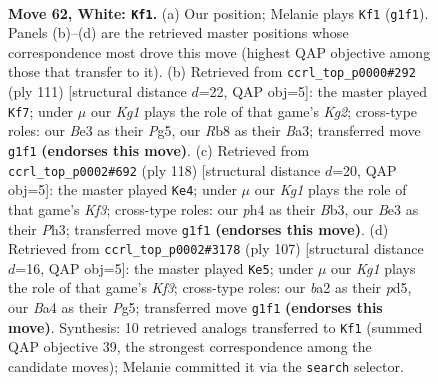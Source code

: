 \documentclass[11pt]{article}
\begin{document}
\clearpage

\begin{figure}[p]\centering
\begin{subfigure}{0.46\textwidth}\centering
\resizebox{\linewidth}{!}{%
\newchessgame
\chessboard[
  setfen={1R6/7k/4r3/8/B3p2p/4Bp1P/b4P2/6K1 w - - 34 62},
  showmover=false,
  pgfstyle=straightmove, color=movearrow, markmove={g1-f1}
]}
\caption{}
\end{subfigure}\hfill
\begin{subfigure}{0.46\textwidth}\centering
\resizebox{\linewidth}{!}{%
\newchessgame
\chessboard[
  setfen={8/3K2k1/7p/p4Pp1/P5P1/b6P/4B3/8 b - - 28 56},
  showmover=false,
  pgfstyle=straightmove, color=movearrow, markmove={g7-f7}
]}
\caption{}
\end{subfigure}
\\[4pt]
\begin{subfigure}{0.46\textwidth}\centering
\resizebox{\linewidth}{!}{%
\newchessgame
\chessboard[
  setfen={3b1k2/8/4Pp2/6p1/6P1/pB3K1P/8/8 w - - 1 60},
  showmover=false,
  pgfstyle=straightmove, color=movearrow, markmove={f3-e4}
]}
\caption{}
\end{subfigure}\hfill
\begin{subfigure}{0.46\textwidth}\centering
\resizebox{\linewidth}{!}{%
\newchessgame
\chessboard[
  setfen={8/2r5/1p3k2/p2P2p1/Pb4B1/3KP3/5P2/R7 b - - 0 54},
  showmover=false,
  pgfstyle=straightmove, color=movearrow, markmove={f6-e5}
]}
\caption{}
\end{subfigure}
\caption{\textbf{Move 62, White: \texttt{Kf1}.} (a) Our position; Melanie plays \texttt{Kf1} (\texttt{g1f1}). Panels (b)--(d) are the retrieved master positions whose correspondence most drove this move (highest QAP objective among those that transfer to it). (b) Retrieved from \texttt{ccrl\_top\_p0000\#292} (ply 111) [structural distance $d$=22, QAP obj=5]: the master played \texttt{Kf7}; under $\mu$ our \emph{Kg1} plays the role of that game's \emph{Kg2}; cross-type roles: our \emph{B}e3 as their \emph{P}g5, our \emph{R}b8 as their \emph{B}a3; transferred move \texttt{g1f1} \textbf{(endorses this move)}. (c) Retrieved from \texttt{ccrl\_top\_p0002\#692} (ply 118) [structural distance $d$=20, QAP obj=5]: the master played \texttt{Ke4}; under $\mu$ our \emph{Kg1} plays the role of that game's \emph{Kf3}; cross-type roles: our \emph{p}h4 as their \emph{B}b3, our \emph{B}e3 as their \emph{P}h3; transferred move \texttt{g1f1} \textbf{(endorses this move)}. (d) Retrieved from \texttt{ccrl\_top\_p0002\#3178} (ply 107) [structural distance $d$=16, QAP obj=5]: the master played \texttt{Ke5}; under $\mu$ our \emph{Kg1} plays the role of that game's \emph{Kf3}; cross-type roles: our \emph{b}a2 as their \emph{p}d5, our \emph{B}a4 as their \emph{P}g5; transferred move \texttt{g1f1} \textbf{(endorses this move)}. Synthesis: 10 retrieved analogs transferred to \texttt{Kf1} (summed QAP objective 39, the strongest correspondence among the candidate moves); Melanie committed it via the \texttt{search} selector.}
\label{fig:thought-m122}
\end{figure}
\end{document}
